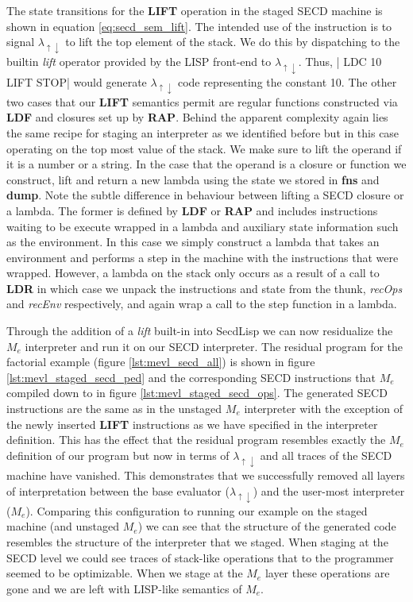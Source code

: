 \documentclass[a4paper,12pt,twoside,openright]{report}
\theoremstyle{definition}
\newcommand{\mslang}{$\lambda_{\uparrow\downarrow}$}
\newcommand{\mevl}{$M_{e}$}
\newcommand{\secdlisp}{SecdLisp}
\begin{document}
The state transitions for the \textbf{LIFT} operation in the staged SECD machine is shown in equation \ref{eq:secd_sem_lift}. The intended use of the instruction is to signal \mslang{} to lift the top element of the stack. We do this by dispatching to the builtin \textit{lift} operator provided by the LISP front-end to \mslang. Thus, |   LDC 10 LIFT STOP| would generate \mslang{} code representing the constant 10. The other two cases that our \textbf{LIFT} semantics permit are regular functions constructed via \textbf{LDF} and closures set up by \textbf{RAP}. Behind the apparent complexity again lies the same recipe for staging an interpreter as we identified before but in this case operating on the top most value of the stack. We make sure to lift the operand if it is a number or a string. In the case that the operand is a closure or function we construct, lift and return a new lambda using the state we stored in \textbf{fns} and \textbf{dump}. Note the subtle difference in behaviour between lifting a SECD closure or a lambda. The former is defined by \textbf{LDF} or \textbf{RAP} and includes instructions waiting to be execute wrapped in a lambda and auxiliary state information such as the environment. In this case we simply construct a lambda that takes an environment and performs a step in the machine with the instructions that were wrapped. However, a lambda on the stack only occurs as a result of a call to \textbf{LDR} in which case we unpack the instructions and state from the thunk, \textit{recOps} and \textit{recEnv} respectively, and again wrap a call to the step function in a lambda.

Through the addition of a \textit{lift} built-in into \secdlisp{} we can now residualize the \mevl{} interpreter and run it on our SECD interpreter. The residual program for the factorial example (figure \ref{lst:mevl_secd_all}) is shown in figure \ref{lst:mevl_staged_secd_ped} and the corresponding SECD instructions that \mevl compiled down to in figure \ref{lst:mevl_staged_secd_ops}. The generated SECD instructions are the same as in the unstaged \mevl{} interpreter with the exception of the newly inserted \textbf{LIFT} instructions as we have specified in the interpreter definition. This has the effect that the residual program resembles exactly the \mevl{} definition of our program but now in terms of \mslang{} and all traces of the SECD machine have vanished. This demonstrates that we successfully removed all layers of interpretation between the base evaluator (\mslang{}) and the user-most interpreter (\mevl{}). Comparing this configuration to running our example on the staged machine (and unstaged \mevl{}) we can see that the structure of the generated code resembles the structure of the interpreter that we staged. When staging at the SECD level we could see traces of stack-like operations that to the programmer seemed to be optimizable. When we stage at the \mevl{} layer these operations are gone and we are left with LISP-like semantics of \mevl{}.
\end{document}
